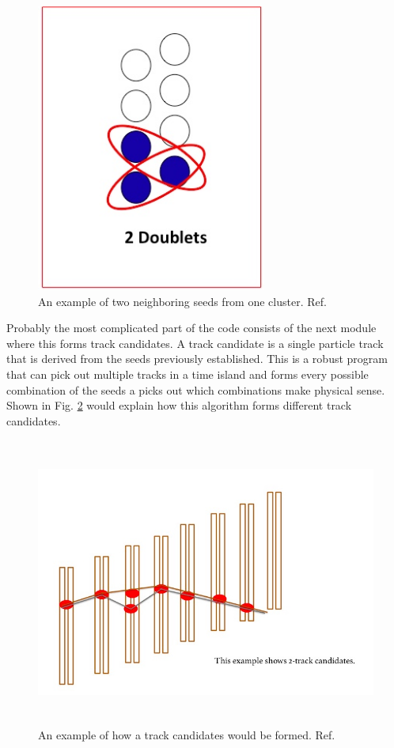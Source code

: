 \documentclass[./Thesis]{subfiles}
\begin{document}
\begin{figure}
	\centerline{\includegraphics[height=95mm]{doubleseed.jpeg}}
	\caption[Double Seed]{ An example of  two neighboring seeds from one cluster.  Ref. \cite{trackerWiki}
	}
	\label{fig:doubleseed}
\end{figure} 
	
	Probably the most complicated part of the code consists of the next module where this forms track candidates. A track candidate is a single particle track that is derived from the seeds previously established.  This is a robust program that can pick out multiple tracks in a time island and forms every possible combination of the seeds a picks out which combinations make physical sense.  Shown in Fig. \ref{fig:trackcandidate} would explain how this algorithm forms different track candidates.
	
\begin{figure}
	\centerline{\includegraphics[height=95mm]{trackcandidate.jpeg}}
	\caption[Track Candidate]{ An example of how a track candidates would be formed.  Ref. \cite{trackerWiki}
	}
	\label{fig:trackcandidate}
\end{figure} 
	
\end{document}

